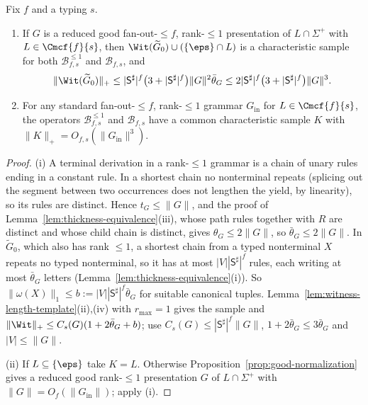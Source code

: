 \begin{theorem}
\label{thm:rankone-polydata}
Fix $f$ and a typing $s$.
\begin{enumerate}[label=\textup{(\roman*)},leftmargin=*]
\item If $G$ is a reduced good fan-out-$\le f$, rank-$\le1$ presentation of
$L\cap\Sigma^+$ with $L\in\Cmcf{f}{s}$, then
$\Wit(\widetilde G_0)\cup(\{\eps\}\cap L)$ is a characteristic sample for both
$\mathcal B^{\le1}_{f,s}$ and $\mathcal B_{f,s}$, and
\[
 \|\Wit(\widetilde G_0)\|_+\le|\mathsf S^\sharp|^f\bigl(3+|\mathsf S^\sharp|^f\bigr)
 \|G\|^2\bar\theta_G
 \le2|\mathsf S^\sharp|^f\bigl(3+|\mathsf S^\sharp|^f\bigr)\|G\|^3 .
\]
\item For any standard fan-out-$\le f$, rank-$\le1$ grammar $G_{\mathrm{in}}$ for
$L\in\Cmcf{f}{s}$, the operators $\mathcal B^{\le1}_{f,s}$ and $\mathcal B_{f,s}$
have a common characteristic sample $K$ with $\|K\|_+=O_{f,s}(\|G_{\mathrm{in}}\|^3)$.
\end{enumerate}
\end{theorem}

\begin{proof}
(i) A terminal derivation in a rank-$\le1$ grammar is a chain of unary rules
ending in a constant rule.  In a shortest chain no nonterminal repeats (splicing
out the segment between two occurrences does not lengthen the yield, by
linearity), so its rules are distinct.  Hence $t_G\le\|G\|$, and the proof of
Lemma~\ref{lem:thickness-equivalence}(iii), whose path rules together with $R$ are
distinct and whose child chain is distinct, gives $\theta_G\le2\|G\|$, so
$\bar\theta_G\le2\|G\|$.  In $\widetilde G_0$, which also has rank $\le1$, a shortest
chain from a typed nonterminal $X$ repeats no typed nonterminal, so it has at
most $|V||\mathsf S^\sharp|^f$ rules, each writing at most $\bar\theta_G$
letters (Lemma~\ref{lem:thickness-equivalence}(i)).  So
$\|\omega(X)\|_1\le b:=|V||\mathsf S^\sharp|^f\bar\theta_G$ for suitable canonical
tuples.  Lemma~\ref{lem:witness-length-template}(ii),(iv) with $r_{\max}=1$ gives
the sample and
$\|\Wit\|_+\le C_s(G)(1+2\bar\theta_G+b)$; use
$C_s(G)\le|\mathsf S^\sharp|^f\|G\|$, $1+2\bar\theta_G\le3\bar\theta_G$ and
$|V|\le\|G\|$.

(ii) If $L\subseteq\{\eps\}$ take $K=L$.  Otherwise
Proposition~\ref{prop:good-normalization} gives a reduced good rank-$\le1$
presentation $G$ of $L\cap\Sigma^+$ with $\|G\|=O_f(\|G_{\mathrm{in}}\|)$; apply (i).
\end{proof}

